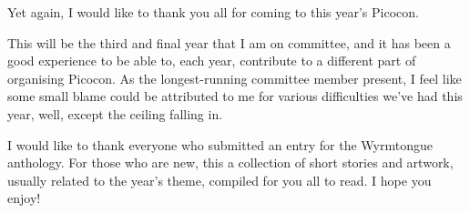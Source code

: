 
\begingroup
\setlength{\parskip}{7pt}  
Yet again, I would like to thank you all for coming to this year's Picocon. 

This will be the third and final year that I am on committee, and it has been a good experience to be able to, each year, contribute to a different part of organising Picocon. As the longest-running committee member present, I feel like some small blame could be attributed to me for various difficulties we've had this year, well, except the ceiling falling in.

I would like to thank everyone who submitted an entry for the Wyrmtongue anthology. For those who are new, this a collection of short stories and artwork, usually related to the year's theme, compiled for you all to read. I hope you enjoy!
\endgroup




